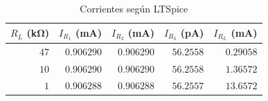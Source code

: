 \begin{table}[H]
    \centering
    \begin{tabular}{@{}r|rrrr@{}}
        \toprule
        $R_L$ (\si{\kilo\ohm}) & $I_{R_1}$ (\si{\milli\ampere}) &
        $I_{R_2}$ (\si{\milli\ampere}) & $I_{R_3}$ (\si{\pico\ampere}) &
        $I_{R_L}$ (\si{\milli\ampere}) \\
        \midrule
        $47$ & $0.906290$ & $0.906290$ & $56.2558$ & $0.29058$ \\
        $10$ & $0.906290$ & $0.906290$ & $56.2558$ & $1.36572$ \\
         $1$ & $0.906288$ & $0.906288$ & $56.2557$ & $13.6572$ \\ \bottomrule
        \end{tabular}
        \caption{Corrientes según LTSpice}
        \label{tab:1:ltspice-corrientes}
\end{table}


